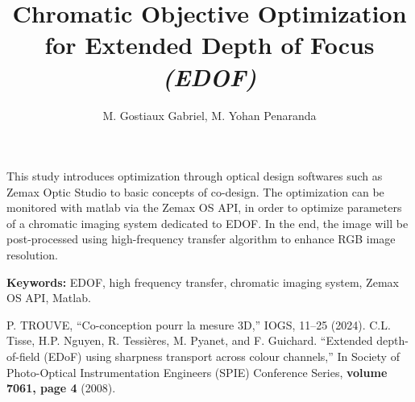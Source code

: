 \documentclass[10pt,letterpaper]{article}
\begin{document}
\title{Chromatic Objective Optimization for Extended Depth of Focus \textit{(EDOF)}}

\author{M. Gostiaux Gabriel, M. Yohan Penaranda}

\address{M. Gabriel Gostiaux, Master of Science student, Institute of Optics, \\ Palaiseau, 91 120, France}


\address{M. Yohan Penaranda, Master of Science student, Institute of Optics, \\ Palaiseau, 91 120, France}




\begin{abstract*}
This study introduces optimization through optical design softwares such as Zemax Optic Studio to basic concepts of co-design. The optimization can be monitored with matlab via the Zemax OS API, in order to optimize parameters of a chromatic imaging system dedicated to EDOF. In the end, the image will be post-processed using high-frequency transfer algorithm to enhance RGB image resolution.
\hfill \break

\textbf{Keywords:} EDOF, high frequency transfer, chromatic imaging system, Zemax OS API, Matlab.
\hfill \break

\end{abstract*}


\begin{thebibliography}{99}

 P. TROUVE, ``Co-conception pourr la mesure 3D,'' IOGS, 11--25 (2024).
 C.L. Tisse, H.P. Nguyen, R. Tessières, M. Pyanet, and F. Guichard. ``Extended
depth-of-field (EDoF) using sharpness transport across colour channels,'' In
Society of Photo-Optical Instrumentation Engineers (SPIE) Conference Series, {\bf volume 7061, page 4} (2008).

\end{thebibliography}
\end{document}
